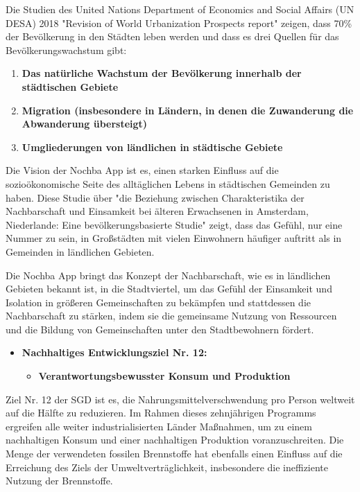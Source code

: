 Die Studien des United Nations Department of Economics and Social Affairs (UN DESA) 2018 "Revision of World Urbanization Prospects report" \cite{Worlds-Urbanization-Prospects} zeigen, dass 70\% der Bevölkerung in den Städten leben werden und dass es drei Quellen für das Bevölkerungswachstum gibt:

\begin{enumerate}
    \item \textbf{Das natürliche Wachstum der Bevölkerung innerhalb der städtischen Gebiete}
    \item \textbf{Migration (insbesondere in Ländern, in denen die Zuwanderung die Abwanderung übersteigt)}
    \item \textbf{Umgliederungen von ländlichen in städtische Gebiete}
\end{enumerate}
        
Die Vision der Nochba App ist es, einen starken Einfluss auf die sozioökonomische Seite des alltäglichen Lebens in städtischen Gemeinden zu haben. Diese Studie über "die Beziehung zwischen Charakteristika der Nachbarschaft und Einsamkeit bei älteren Erwachsenen in Amsterdam, Niederlande: Eine bevölkerungsbasierte Studie" \cite{neighbourhood-characteristics-and-loneliness} zeigt, dass das Gefühl, nur eine Nummer zu sein, in Großstädten mit vielen Einwohnern häufiger auftritt als in Gemeinden in ländlichen Gebieten. 

Die Nochba App bringt das Konzept der Nachbarschaft, wie es in ländlichen Gebieten bekannt ist, in die Stadtviertel, um das Gefühl der Einsamkeit und Isolation in größeren Gemeinschaften zu bekämpfen und stattdessen die Nachbarschaft zu stärken, indem sie die gemeinsame Nutzung von Ressourcen und die Bildung von Gemeinschaften unter den Stadtbewohnern fördert. 

\begin{itemize}
    \item \textbf{Nachhaltiges Entwicklungsziel Nr. 12:}
    \begin{itemize}
        \item \textbf{Verantwortungsbewusster Konsum und Produktion}
    \end{itemize}
\end{itemize}

Ziel Nr. 12 der SGD ist es, die Nahrungsmittelverschwendung pro Person weltweit auf die Hälfte zu reduzieren. Im Rahmen dieses zehnjährigen Programms ergreifen alle weiter industrialisierten Länder Maßnahmen, um zu einem nachhaltigen Konsum und einer nachhaltigen Produktion voranzuschreiten. Die Menge der verwendeten fossilen Brennstoffe hat ebenfalls einen Einfluss auf die Erreichung des Ziels der Umweltverträglichkeit, insbesondere die ineffiziente Nutzung der Brennstoffe. 

